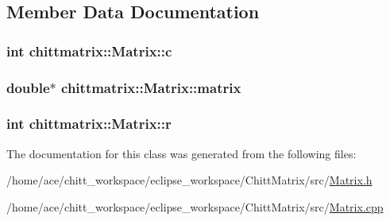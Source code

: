 \subsection{\-Member \-Data \-Documentation}
\hypertarget{classchittmatrix_1_1Matrix_aab6aec1cade4ba4006674bbb57eaad7c}{
\subsubsection[{c}]{\setlength{\rightskip}{0pt plus 5cm}int {\bf chittmatrix\-::\-Matrix\-::c}}}\label{classchittmatrix_1_1Matrix_aab6aec1cade4ba4006674bbb57eaad7c}
\hypertarget{classchittmatrix_1_1Matrix_ae59d87ec4c53e05bae49f1770151ac8f}{
\subsubsection[{matrix}]{\setlength{\rightskip}{0pt plus 5cm}double$\ast$ {\bf chittmatrix\-::\-Matrix\-::matrix}}}\label{classchittmatrix_1_1Matrix_ae59d87ec4c53e05bae49f1770151ac8f}
\hypertarget{classchittmatrix_1_1Matrix_a3dba1697809db31f6341dd80abf8545d}{
\subsubsection[{r}]{\setlength{\rightskip}{0pt plus 5cm}int {\bf chittmatrix\-::\-Matrix\-::r}}}\label{classchittmatrix_1_1Matrix_a3dba1697809db31f6341dd80abf8545d}


\-The documentation for this class was generated from the following files\-:\begin{DoxyCompactItemize}
\item 
/home/ace/chitt\-\_\-workspace/eclipse\-\_\-workspace/\-Chitt\-Matrix/src/\hyperlink{Matrix_8h}{\-Matrix.\-h}\item 
/home/ace/chitt\-\_\-workspace/eclipse\-\_\-workspace/\-Chitt\-Matrix/src/\hyperlink{Matrix_8cpp}{\-Matrix.\-cpp}\end{DoxyCompactItemize}
